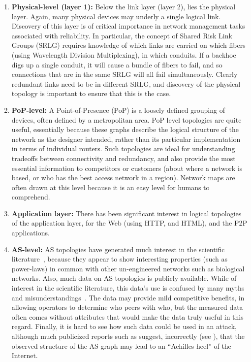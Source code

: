 \begin{enumerate}
\item {\bf Physical-level (layer 1):} Below the link layer (layer 2),
  lies the physical layer. Again, many physical devices may underly a
  single logical link. Discovery of this layer is of critical
  importance in network management tasks associated with
  reliability. In particular, the concept of Shared Risk Link Groups
  (SRLG) requires knowledge of which links are carried on which fibers
  (using Wavelength Division Multiplexing), in which conduits. If a
  backhoe digs up a single conduit, it will cause a bundle of fibers
  to fail, and so connections that are in the same SRLG will all fail
  simultaneously. Clearly redundant links need to be in different
  SRLG, and discovery of the physical topology is important to ensure
  that this is the case.

\item {\bf PoP-level:} A Point-of-Presence (PoP) is a loosely defined
  grouping of devices, often defined by a metropolitan area.  PoP
  level topologies are quite useful, essentially because these graphs
  describe the logical structure of the network as the designer
  intended, rather than its particular implementation in terms of
  individual routers. Such topologies are ideal for understanding
  tradeoffs between connectivity and redundancy, and also provide the
  most essential information to competitors or customers (about where
  a network is based, or who has the best access network in a
  region). Network maps are often drawn at this level because it is an
  easy level for humans to comprehend.

\item {\bf Application layer:} There has been significant interest in
  logical topologies of the application layer, \eg for the Web
  (using HTTP, and HTML), and the P2P applications. 

\item {\bf AS-level:} AS topologies have generated much interest in
  the scientific literature~\cite{barabasi99,barabasi00,barabasi02},
  because they appear to show interesting properties (such as
  power-laws) in common with other un-engineered networks such as
  biological networks. Also, much data on AS topologies is publicly
  available. While of interest in the scientific literature, this
  data's use is confused by many myths and
  misunderstandings~\cite{roughan11}.  The data may provide mild
  competitive benefits, in allowing operators to determine who peers
  with who, but the measured data often comes without attributes that
  would make the data truly useful in this regard. Finally, it is hard
  to see how such data could be used in an attack, although much
  publicized reports such as \cite{barabasi02} suggest, incorrectly
  (see \cite{Li04}), that the observed structure of the AS graph may
  lead to an ``Achilles heel'' of the Internet.


\end{enumerate}
